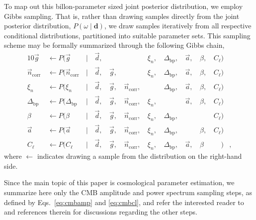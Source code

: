 \documentclass[twocolumn]{aa}
\renewcommand{\d}[0]{\vec{d}}
\newcommand{\n}[0]{\vec{n}}
\renewcommand{\a}[0]{\vec{a}}
\newcommand{\g}[0]{\vec{g}}
\newcommand{\Dbp}[0]{\Delta_{\mathrm{bp}}}
\begin{document}
To map out this billon-parameter sized joint posterior distribution,
we employ Gibbs sampling. That is, rather than drawing samples
directly from the joint posterior distribution, $P(\omega
\mid\mathbf{d})$, we draw samples iteratively from all respective
conditional distributions, partitioned into suitable parameter sets. This sampling scheme may be formally
summarized through the following Gibbs chain,
\begin{alignat}{10}
\g &\,\leftarrow P(\g&\,\mid &\,\d,&\, & &\,\xi_n, &\,\Dbp, &\,\a, &\,\beta, &\,C_{\ell})\\
\n_{\mathrm{corr}} &\,\leftarrow P(\n_{\mathrm{corr}}&\,\mid &\,\d, &\,\g, &\,&\,\xi_n,
&\,\Dbp, &\,\a, &\,\beta, &\,C_{\ell})\\
\xi_n &\,\leftarrow P(\xi_n&\,\mid &\,\d, &\,\g, &\,\n_{\mathrm{corr}}, &\,
&\,\Dbp, &\,\a, &\,\beta, &\,C_{\ell})\\
\Dbp &\,\leftarrow P(\Dbp&\,\mid &\,\d, &\,\g, &\,\n_{\mathrm{corr}}, &\,\xi_n,
&\,&\,\a, &\,\beta, &\,C_{\ell})\\
\beta &\,\leftarrow P(\beta&\,\mid &\,\d, &\,\g, &\,\n_{\mathrm{corr}}, &\,\xi_n,
&\,\Dbp, & &\,&\,C_{\ell})\\\label{eq:cmbamp}
\a &\,\leftarrow P(\a&\,\mid &\,\d, &\,\g, &\,\n_{\mathrm{corr}}, &\,\xi_n,
&\,\Dbp, &\,&\,\beta, &\,C_{\ell})\\\label{eq:cmbcl}
C_{\ell} &\,\leftarrow P(C_{\ell}&\,\mid &\,\d, &\,\g, &\,\n_{\mathrm{corr}}, &\,\xi_n,
&\,\Dbp, &\,\a, &\,\beta&\,\phantom{C_{\ell}})&,
\end{alignat}
where $\leftarrow$ indicates drawing a sample from the distribution on
the right-hand side.

Since the main topic of this paper is cosmological parameter
estimation, we summarize here only the CMB amplitude and power
spectrum sampling steps, as defined by Eqs.~\eqref{eq:cmbamp} and
\eqref{eq:cmbcl}, and refer the interested reader to \citet{bp01} and
references therein for discussions regarding the other steps.
\end{document}
